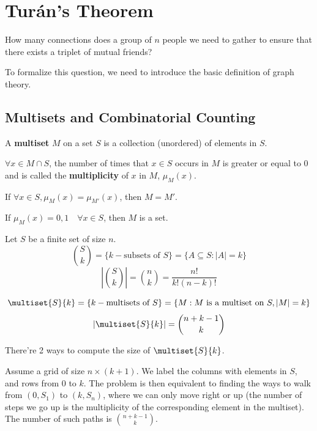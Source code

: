 \chapter{Tur\'{a}n's Theorem}

\begin{question}\label{question:1}
	How many connections does a group of $n$ people we need to gather to ensure that there exists a triplet of mutual friends?
\end{question}

To formalize this question, we need to introduce the basic definition of graph theory.

\section{Multisets and Combinatorial Counting}

\begin{definition}[Multiset]
	A \textbf{multiset} $M$ on a set $S$ is a collection (unordered) of elements in $S$.

	$\forall x\in M\cap S$, the number of times that $x\in S$ occurs in $M$ is greater or equal to $0$ and is called the \textbf{multiplicity} of $x$ in $M$, $\mu_M(x)$.

	If $\forall x\in S, \mu_M(x) = \mu_{M'}(x)$, then $M = M'$.
\end{definition}

\begin{eg}
	If $\mu_M(x) = 0,1\quad\forall x\in S$, then $M$ is a set.
\end{eg}

\begin{definition}
	Let $S$ be a finite set of size $n$.
	\[
		\binom{S}{k} = \{k-\text{subsets of }S\} = \{A\subseteq S: |A| = k\}
	\]
	\[ \left|\binom{S}{k}\right| = \binom{n}{k} = \frac{n!}{k!(n-k)!}
	\]

	\[
		\multiset{S}{k} = \{k-\text{multisets of }S\} = \{M: M\text{ is a multiset on }S, |M| = k\}
	\]
	\[ \left|\multiset{S}{k}\right| = \binom{n+k-1}{k}\]

\end{definition}

There're 2 ways to compute the size of $\multiset{S}{k}$.

Assume a grid of size $n\times (k+1)$. We label the columns with elements in $S$, and rows from $0$ to $k$. The problem is then equivalent to finding the ways to walk from $(0,S_1)$ to $(k,S_n)$, where we can only move right or up (the number of steps we go up is the multiplicity of the corresponding element in the multiset). The number of such paths is $\binom{n+k-1}{k}$.


